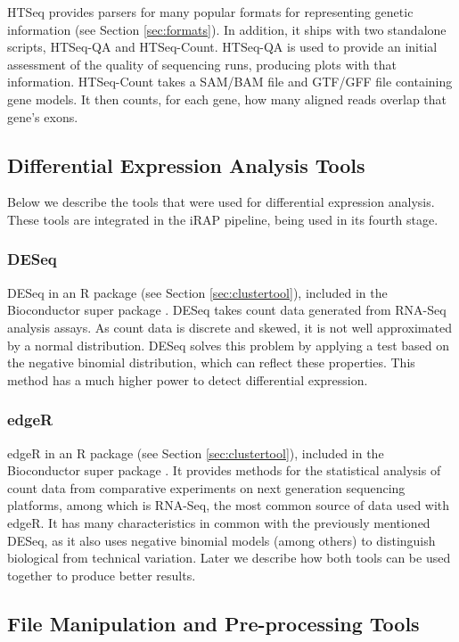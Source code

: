 HTSeq provides parsers for many popular formats for representing genetic
information (see Section \ref{sec:formats}). In addition, it ships with two
standalone scripts, HTSeq-QA and HTSeq-Count. HTSeq-QA is used to provide an
initial assessment of the quality of sequencing runs, producing plots with that
information. HTSeq-Count takes a SAM/BAM file and GTF/GFF file containing gene
models. It then counts, for each gene, how many aligned reads overlap that
gene's exons.

\subsection{Differential Expression Analysis Tools}

Below we describe the tools that were used for differential expression analysis.
These tools are integrated in the iRAP pipeline, being used in its fourth stage.

\subsubsection*{DESeq}

DESeq in an R package (see Section \ref{sec:clustertool}), included in the
Bioconductor super package \cite{20979621}. DESeq takes count data generated
from RNA-Seq analysis assays. As count data is discrete and skewed, it is not
well approximated by a normal distribution. DESeq solves this problem by
applying a test based on the negative binomial distribution, which can reflect
these properties. This method has a much higher power to detect differential
expression.

\subsubsection*{edgeR}

edgeR in an R package (see Section \ref{sec:clustertool}), included in the
Bioconductor super package \cite{robinson2010edger}. It provides methods for the
statistical analysis of count data from comparative experiments on next
generation sequencing platforms, among which is RNA-Seq, the most common source
of data used with edgeR. It has many characteristics in common with the
previously mentioned DESeq, as it also uses negative binomial models (among
others) to distinguish biological from technical variation. Later we describe
how both tools can be used together to produce better results.

\subsection{File Manipulation and Pre-processing Tools}

